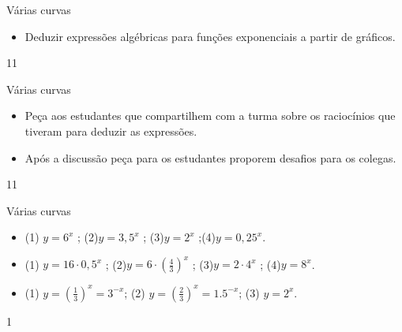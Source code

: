 \clearmargin
\begin{objectives}{Várias curvas}
{
\begin{itemize}
\item Deduzir expressões algébricas para funções exponenciais a partir de gráficos.

\end{itemize}
}{1}{1}
\end{objectives}
\begin{sugestions}{Várias curvas}
{
\begin{itemize}

\item Peça aos estudantes que compartilhem com a turma sobre os raciocínios que tiveram para deduzir as expressões.

\item Após a discussão peça para os estudantes proporem desafios para os colegas.

\end{itemize}
}{1}{1}
\end{sugestions}
\begin{answer}{Várias curvas}
{
\begin{itemize}

\item (1) $y=6^x$ ; (2)$y=3{,}5^x$ ; (3)$y=2^x$ ;(4)$y=0{,}25^x$.

\item (1) $y=16 \cdot 0{,}5^x$ ; (2)$y=6\cdot \left(\frac 43\right)^x$ ; (3)$y=2\cdot 4^x$ ; (4)$y=8^x$.

\item (1) $y=\left(\frac 13\right)^x=3^{-x}$; (2) $y=\left(\frac 23\right)^x=1.5^{-x}$; (3) $y=2^x$.


\end{itemize}
}{1}
\end{answer}

